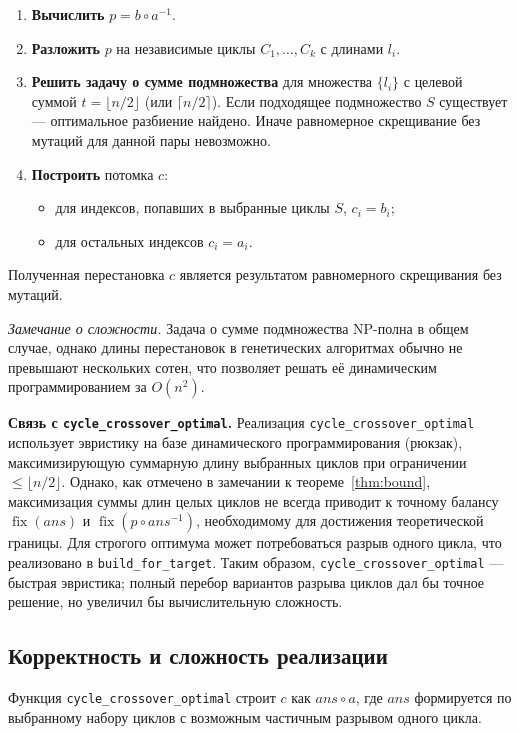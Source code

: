 \documentclass[732]{studrep}
\DeclareMathOperator{\fix}{fix}          %
\newcommand{\ans}{\mathit{ans}}          %
\theoremstyle{nonumberplain}
\begin{document}
\begin{enumerate}
\item \textbf{Вычислить} $p = b\circ a^{-1}$.
\item \textbf{Разложить} $p$ на независимые циклы $C_1,\dots,C_k$ с длинами $l_i$.
\item \textbf{Решить задачу о сумме подмножества} для множества $\{l_i\}$ с целевой суммой $t = \lfloor n/2\rfloor$ (или $\lceil n/2\rceil$). Если подходящее подмножество $S$ существует — оптимальное разбиение найдено. Иначе равномерное скрещивание без мутаций для данной пары невозможно.
\item \textbf{Построить} потомка $c$:
  \begin{itemize}
  \item для индексов, попавших в выбранные циклы $S$, $c_i = b_i$;
  \item для остальных индексов $c_i = a_i$.
  \end{itemize}
\end{enumerate}

Полученная перестановка $c$ является результатом равномерного скрещивания без мутаций.

\textit{Замечание о сложности.} Задача о сумме подмножества NP-полна в общем случае, однако длины перестановок в генетических алгоритмах обычно не превышают нескольких сотен, что позволяет решать её динамическим программированием за $O(n^2)$.

\textbf{Связь с \texttt{cycle\_crossover\_optimal}.} Реализация \texttt{cycle\_crossover\_optimal} использует эвристику на базе динамического программирования (рюкзак), максимизирующую суммарную длину выбранных циклов при ограничении $\le \lfloor n/2\rfloor$. Однако, как отмечено в замечании к теореме~\ref{thm:bound}, максимизация суммы длин целых циклов не всегда приводит к точному балансу $\fix(\ans)$ и $\fix(p\circ\ans^{-1})$, необходимому для достижения теоретической границы. Для строгого оптимума может потребоваться разрыв одного цикла, что реализовано в \texttt{build\_for\_target}. Таким образом, \texttt{cycle\_crossover\_optimal} — быстрая эвристика; полный перебор вариантов разрыва циклов дал бы точное решение, но увеличил бы вычислительную сложность.

\subsection{Корректность и сложность реализации}
\label{sec:correctness}

Функция \texttt{cycle\_crossover\_optimal} строит $c$ как $\ans\circ a$, где $\ans$ формируется по выбранному набору циклов с возможным частичным разрывом одного цикла.
\end{document}
